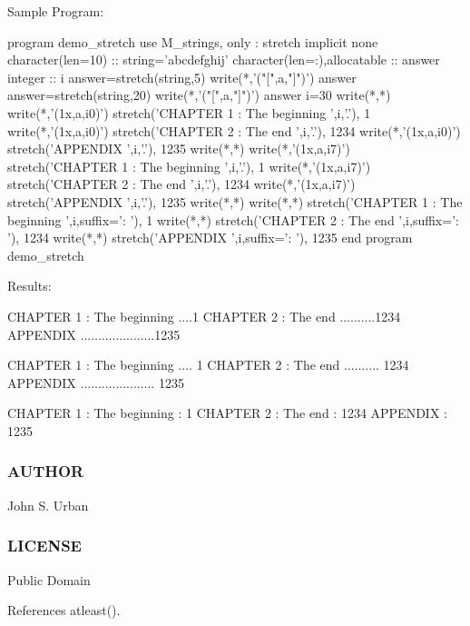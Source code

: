 Sample Program\+: \begin{DoxyVerb} program demo_stretch
  use M_strings, only : stretch
  implicit none
  character(len=10)            :: string='abcdefghij'
  character(len=:),allocatable :: answer
  integer                      :: i
     answer=stretch(string,5)
     write(*,'("[",a,"]")') answer
     answer=stretch(string,20)
     write(*,'("[",a,"]")') answer
     i=30
     write(*,*)
     write(*,'(1x,a,i0)') stretch('CHAPTER 1 : The beginning ',i,'.'), 1
     write(*,'(1x,a,i0)') stretch('CHAPTER 2 : The end ',i,'.'),       1234
     write(*,'(1x,a,i0)') stretch('APPENDIX ',i,'.'),                  1235
     write(*,*)
     write(*,'(1x,a,i7)') stretch('CHAPTER 1 : The beginning ',i,'.'), 1
     write(*,'(1x,a,i7)') stretch('CHAPTER 2 : The end ',i,'.'),       1234
     write(*,'(1x,a,i7)') stretch('APPENDIX ',i,'.'),                  1235
     write(*,*)
     write(*,*) stretch('CHAPTER 1 : The beginning ',i,suffix=': '), 1
     write(*,*) stretch('CHAPTER 2 : The end ',i,suffix=': '),       1234
     write(*,*) stretch('APPENDIX ',i,suffix=': '),                  1235
 end program demo_stretch
\end{DoxyVerb}


Results\+: \begin{DoxyVerb}[abcdefghij]
[abcdefghij          ]

 CHAPTER 1 : The beginning ....1
 CHAPTER 2 : The end ..........1234
 APPENDIX .....................1235

 CHAPTER 1 : The beginning ....      1
 CHAPTER 2 : The end ..........   1234
 APPENDIX .....................   1235

 CHAPTER 1 : The beginning     :            1
 CHAPTER 2 : The end           :         1234
 APPENDIX                      :         1235
\end{DoxyVerb}


\subsubsection*{A\+U\+T\+H\+OR}

John S. Urban \subsubsection*{L\+I\+C\+E\+N\+SE}

Public Domain 

References atleast().

